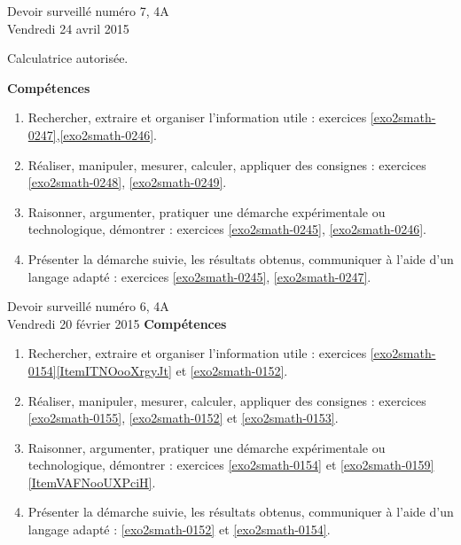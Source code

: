 \documentclass[a4paper,10pt]{article}
\begin{document}
\begin{feuilleDS}{Devoir surveillé numéro 7, 4A\\ \small Vendredi 24 avril 2015}
    \begin{center}
        \small Calculatrice autorisée.
    \end{center}


\vspace{1cm}
{\bf Compétences}
\small
\begin{enumerate}
    \item
        Rechercher, extraire et organiser l'information utile : exercices \ref{exo2smath-0247},\ref{exo2smath-0246}.
    \item
        Réaliser, manipuler, mesurer, calculer, appliquer des consignes : exercices \ref{exo2smath-0248}, \ref{exo2smath-0249}.
    \item
        Raisonner, argumenter, pratiquer une démarche expérimentale ou technologique, démontrer : exercices \ref{exo2smath-0245}, \ref{exo2smath-0246}.
    \item 
        Présenter la démarche suivie, les résultats obtenus, communiquer à l'aide d’un langage adapté : exercices \ref{exo2smath-0245}, \ref{exo2smath-0247}.
\end{enumerate}
\end{feuilleDS}




\begin{feuilleDS}{Devoir surveillé numéro 6, 4A\\ \small Vendredi 20 février 2015}
\vspace{1cm}
{\bf Compétences}
\small
\begin{enumerate}
    \item
        Rechercher, extraire et organiser l'information utile : exercices \ref{exo2smath-0154}\ref{ItemITNOooXrgyJt} et \ref{exo2smath-0152}.
    \item
        Réaliser, manipuler, mesurer, calculer, appliquer des consignes : exercices \ref{exo2smath-0155}, \ref{exo2smath-0152} et \ref{exo2smath-0153}.
    \item
        Raisonner, argumenter, pratiquer une démarche expérimentale ou technologique, démontrer : exercices \ref{exo2smath-0154} et \ref{exo2smath-0159}\ref{ItemVAFNooUXPciH}.
    \item 
        Présenter la démarche suivie, les résultats obtenus, communiquer à l'aide d’un langage adapté : \ref{exo2smath-0152} et \ref{exo2smath-0154}.
\end{enumerate}
\end{feuilleDS}
\end{document}
